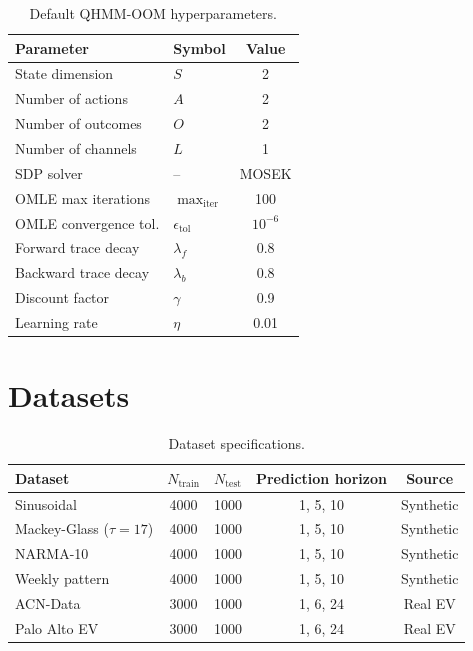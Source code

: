 \begin{table}[htbp]
  \centering
  \caption{Default QHMM-OOM hyperparameters.}
  \label{tab:qhmm_hyperparams}
  \begin{tabular}{@{}llc@{}}
    \toprule
    Parameter & Symbol & Value \\
    \midrule
    State dimension & $S$ & 2 \\
    Number of actions & $A$ & 2 \\
    Number of outcomes & $O$ & 2 \\
    Number of channels & $L$ & 1 \\
    SDP solver & -- & MOSEK \\
    OMLE max iterations & $\max_{\mathrm{iter}}$ & 100 \\
    OMLE convergence tol. & $\epsilon_{\mathrm{tol}}$ & $10^{-6}$ \\
    Forward trace decay & $\lambda_f$ & 0.8 \\
    Backward trace decay & $\lambda_b$ & 0.8 \\
    Discount factor & $\gamma$ & 0.9 \\
    Learning rate & $\eta$ & 0.01 \\
    \bottomrule
  \end{tabular}
\end{table}


\section{Datasets}


\begin{table}[htbp]
  \centering
  \caption{Dataset specifications.}
  \label{tab:dataset_specs}
  \begin{tabular}{@{}lcccc@{}}
    \toprule
    Dataset & $N_{\mathrm{train}}$ & $N_{\mathrm{test}}$ &
    Prediction horizon & Source \\
    \midrule
    Sinusoidal & 4000 & 1000 & 1, 5, 10 & Synthetic \\
    Mackey-Glass ($\tau=17$) & 4000 & 1000 & 1, 5, 10 & Synthetic \\
    NARMA-10 & 4000 & 1000 & 1, 5, 10 & Synthetic \\
    Weekly pattern & 4000 & 1000 & 1, 5, 10 & Synthetic \\
    ACN-Data & 3000 & 1000 & 1, 6, 24 & Real EV \\
    Palo Alto EV & 3000 & 1000 & 1, 6, 24 & Real EV \\
    \bottomrule
  \end{tabular}
\end{table}

